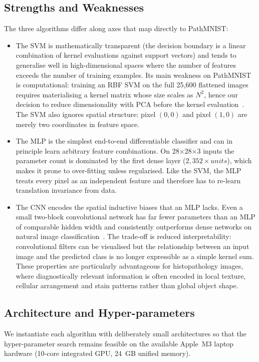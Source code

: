 \documentclass[../main.tex]{subfiles}
\begin{document}
\subsection{Strengths and Weaknesses}
\noindent
The three algorithms differ along axes that map directly to PathMNIST:
\begin{itemize}
    \item The \gls{SVM} is mathematically transparent (the decision
    boundary is a linear combination of kernel evaluations against
    support vectors) and tends to generalise well in high-dimensional
    spaces where the number of features exceeds the number of training
    examples. Its main weakness on PathMNIST is computational: training an
    \gls{RBF} \gls{SVM} on the full 25{,}600 flattened images requires
    materialising a kernel matrix whose size scales as $N^{2}$, hence our
    decision to reduce dimensionality with \gls{PCA} before the kernel
    evaluation~\cite{abdi2010pca}. The \gls{SVM} also ignores spatial
    structure: pixel $(0, 0)$ and pixel $(1, 0)$ are merely two coordinates
    in feature space.
    \item The \gls{MLP} is the simplest end-to-end differentiable
    classifier and can in principle learn arbitrary feature combinations.
    On 28$\times$28$\times$3 inputs the parameter count is dominated by
    the first dense layer ($2{,}352\times \mathit{units}$), which makes it
    prone to over-fitting unless regularised. Like the \gls{SVM}, the
    \gls{MLP} treats every pixel as an independent feature and therefore
    has to re-learn translation invariance from data.
    \item The \gls{CNN} encodes the spatial inductive biases that an
    \gls{MLP} lacks. Even a small two-block convolutional network has
    far fewer parameters than an \gls{MLP} of comparable hidden width and
    consistently outperforms dense networks on natural image
    classification~\cite{lecun1998cnn,krizhevsky2012imagenet}. The trade-off
    is reduced interpretability: convolutional filters can be visualised
    but the relationship between an input image and the predicted class is
    no longer expressible as a simple kernel sum. These properties are particularly advantageous for histopathology images, where diagnostically relevant information is often encoded in local texture, cellular arrangement and stain patterns rather than global object shape.
\end{itemize}

\subsection{Architecture and Hyper-parameters}
\noindent
We instantiate each algorithm with deliberately small architectures so that
the hyper-parameter search remains feasible on the available
\mbox{Apple M3} laptop hardware (10-core integrated \gls{GPU}, 24~GB unified
memory).
\end{document}
